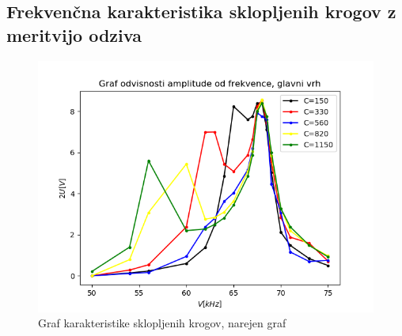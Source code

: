 \documentclass[11pt, a4paper]{article}
\theoremstyle{definition}
\theoremstyle{example}
\theoremstyle{izrek}
\begin{document}
\subsection{Frekvenčna karakteristika sklopljenih krogov z meritvijo odziva}

\begin{figure}[htp]
    \centering
    \includegraphics[width=12cm]{Graf odvisnosti amplitude od frekvence ožji.png}
    \caption{Graf karakteristike sklopljenih krogov, narejen graf}
\end{figure}
\end{document}
